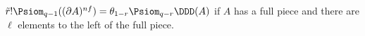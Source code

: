 %

\begin{lemma}
	$\tilde{r}!\Psiom_{q-1}((\partial A)^{nf}) = \theta_{1-r} \Psiom_{q-r}\DDD(A)$ if $A$ has a full piece and there are $\ell$ elements to the left of the full piece.
\end{lemma}

